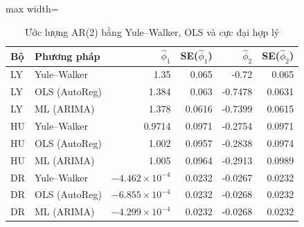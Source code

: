 \begin{table}[H]
\centering\footnotesize
\caption{Ước lượng AR(2) bằng Yule–Walker, OLS và cực đại hợp lý}\label{tab:tab_b11_12_estimators}
\begin{adjustbox}{max width=\linewidth}
\begin{tabular}{|l|l|r|r|r|r|}
\toprule
Bộ & Phương pháp & $\hat{\phi}_{1}$ & SE($\hat{\phi}_{1}$) & $\hat{\phi}_{2}$ & SE($\hat{\phi}_{2}$) \\
\midrule
LY & Yule–Walker & 1.35 & 0.065 & -0.72 & 0.065 \\
LY & OLS (AutoReg) & 1.384 & 0.063 & -0.7478 & 0.0631 \\
LY & ML (ARIMA) & 1.378 & 0.0616 & -0.7399 & 0.0615 \\
HU & Yule–Walker & 0.9714 & 0.0971 & -0.2754 & 0.0971 \\
HU & OLS (AutoReg) & 1.002 & 0.0957 & -0.2838 & 0.0974 \\
HU & ML (ARIMA) & 1.005 & 0.0964 & -0.2913 & 0.0989 \\
DR & Yule–Walker & $-4.462\times10^{-4}$ & 0.0232 & -0.0267 & 0.0232 \\
DR & OLS (AutoReg) & $-6.855\times10^{-4}$ & 0.0232 & -0.0268 & 0.0232 \\
DR & ML (ARIMA) & $-4.299\times10^{-4}$ & 0.0232 & -0.0268 & 0.0232 \\
\bottomrule
\end{tabular}
\end{adjustbox}\par{}
\end{table}
